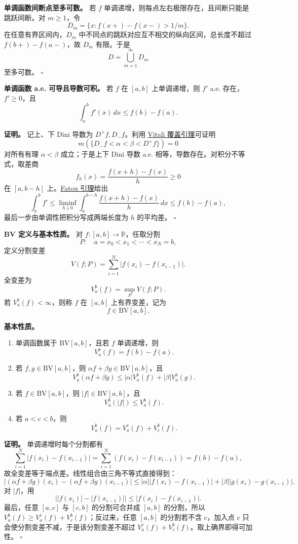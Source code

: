 \documentclass[
UTF8]{ctexart}
\newcommand{\impA}{\hspace{0.4em}{\small\textcolor{impAColor}{\textbf{[A 核心]}}}}
\newcommand{\impB}{\hspace{0.4em}{\small\textcolor{impBColor}{\textbf{[B 重要]}}}}
\newcommand{\thmlabel}[1]{\phantomsection\label{#1}}
\newcommand{\thmref}[2]{\hyperref[#1]{#2}}
\begin{document}
\thmlabel{thm:monotone-discontinuities}\textbf{单调函数间断点至多可数。}\impB
若 \(f\) 单调递增，则每点左右极限存在，且间断只能是跳跃间断。对 \(m\ge1\)，令
\[
  D_m=\{x:f(x+)-f(x-)>1/m\}.
\]
在任意有界区间内，\(D_m\) 中不同点的跳跃对应互不相交的纵向区间，总长度不超过
\(f(b+)-f(a-)\)，故 \(D_m\) 有限。于是
\[
  D=\bigcup_{m=1}^{\infty}D_m
\]
至多可数。 \(\square\)

\thmlabel{thm:monotone-diff}\textbf{单调函数 a.e. 可导且导数可积。}\impA
若 \(f\) 在 \([a,b]\) 上单调递增，则 \(f'\) a.e. 存在，\(f'\ge0\)，且
\[
  \int_a^b f'(x)\,dx\le f(b)-f(a).
\]

\textbf{证明。} 记上、下 Dini 导数为 \(D^+f,D_-f\)。利用
\thmref{thm:vitali}{Vitali 覆盖引理}可证明
\[
  m(\{D_-f<\alpha<\beta<D^+f\})=0
\]
对所有有理 \(\alpha<\beta\) 成立；于是上下 Dini 导数 a.e. 相等，导数存在。对积分不等式，取差商
\[
  f_h(x)=\frac{f(x+h)-f(x)}{h}\ge0
\]
在 \([a,b-h]\) 上。\thmref{thm:fatou}{Fatou 引理}给出
\[
  \int_a^{b}f'\le\liminf_{h\downarrow0}\int_a^{b-h}
  \frac{f(x+h)-f(x)}{h}\,dx
  \le f(b)-f(a),
\]
最后一步由单调性把积分写成两端长度为 \(h\) 的平均差。 \(\square\)

\thmlabel{thm:bv-basic}\textbf{BV 定义与基本性质。}\impA
对 \(f:[a,b]\to\mathbb R\)，任取分割
\[
  P:\quad a=x_0<x_1<\cdots<x_N=b,
\]
定义分割变差
\[
  V(f;P)=\sum_{i=1}^N |f(x_i)-f(x_{i-1})|.
\]
全变差为
\[
  V_a^b(f)=\sup_P V(f;P).
\]
若 \(V_a^b(f)<\infty\)，则称 \(f\) 在 \([a,b]\) 上有界变差，记为
\[
  f\in \mathrm{BV}[a,b].
\]

\textbf{基本性质。}
\begin{enumerate}
\item 单调函数属于 \(\mathrm{BV}[a,b]\)，且若 \(f\) 单调递增，则
\[
  V_a^b(f)=f(b)-f(a).
\]
\item 若 \(f,g\in\mathrm{BV}[a,b]\)，则 \(\alpha f+\beta g\in\mathrm{BV}[a,b]\)，且
\[
  V_a^b(\alpha f+\beta g)\le |\alpha|V_a^b(f)+|\beta|V_a^b(g).
\]
\item 若 \(f\in\mathrm{BV}[a,b]\)，则 \(|f|\in\mathrm{BV}[a,b]\)，且
\[
  V_a^b(|f|)\le V_a^b(f).
\]
\item 若 \(a<c<b\)，则
\[
  V_a^b(f)=V_a^c(f)+V_c^b(f).
\]
\end{enumerate}

\textbf{证明。} 单调递增时每个分割都有
\[
  \sum_{i=1}^N |f(x_i)-f(x_{i-1})|
  =\sum_{i=1}^N(f(x_i)-f(x_{i-1}))
  =f(b)-f(a),
\]
故全变差等于端点差。线性组合由三角不等式直接得到：
\[
  |(\alpha f+\beta g)(x_i)-(\alpha f+\beta g)(x_{i-1})|
  \le |\alpha||f(x_i)-f(x_{i-1})|+|\beta||g(x_i)-g(x_{i-1})|.
\]
对 \(|f|\)，用
\[
  \bigl||f(x_i)|-|f(x_{i-1})|\bigr|
  \le |f(x_i)-f(x_{i-1})|.
\]
最后，任意 \([a,c]\) 与 \([c,b]\) 的分割可合并成 \([a,b]\) 的分割，所以
\(V_a^b(f)\ge V_a^c(f)+V_c^b(f)\)；反过来，任意 \([a,b]\) 的分割若不含
\(c\)，加入点 \(c\) 只会使分割变差不减，于是该分割变差不超过
\(V_a^c(f)+V_c^b(f)\)。取上确界即得可加性。 \(\square\)
\end{document}

